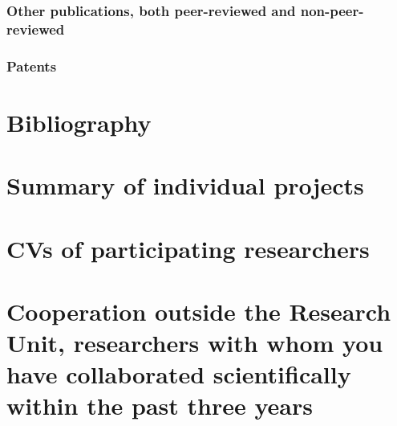 \documentclass{scrartcl}
\begin{document}
\subsubsection{Other publications, both peer-reviewed and non-peer-reviewed}
\printbibliography[category=nonreviewed, heading=none]

\subsubsection{Patents}

\printbibliography[category=patents_pending, heading=none]

\printbibliography[category=patents, heading=none]

\section{Bibliography} %
\printbibliography[notcategory=reviewed, notcategory=nonreviewed, notcategory=patents_pending, notcategory=patents, heading=none]


\section{Summary of individual projects}
%


\section{CVs of participating researchers}
%


\section{Cooperation outside the Research Unit, researchers with whom you have collaborated scientifically within the past three years}
%
\end{document}
